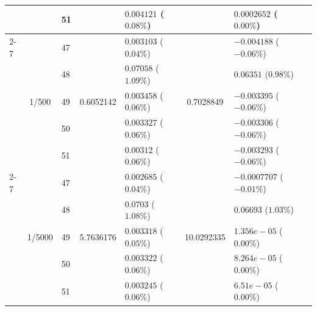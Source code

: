 \begin{table}[htbp]
{\begin{tabular}{lclclclc}
    &                        & 51 &                          & $0.004121$ ($0.08\%$)    &                          & $0.0002652$ ($0.00\%$)     \\
    \cmidrule(lr){2-7}
    & \multirow{5}{*}{1/500} & 47 & \multirow{5}{*}{0.6052142}  & $0.003103$ ($0.04\%$)    & \multirow{5}{*}{0.7028849} & $-0.004188$ ($-0.06\%$)      \\
    &                        & 48 &                          & $0.07058$ ($1.09\%$)  &                          & $0.06351$ ($0.98\%$)     \\
    &                        & 49 &                          & $0.003458$ ($0.06\%$)  &                          & $-0.003395$ ($-0.06\%$)     \\
    &                        & 50 &                          & $0.003327$ ($0.06\%$)  &                          & $-0.003306$ ($-0.06\%$)     \\
    &                        & 51 &                          & $0.00312$ ($0.06\%$)  &                          & $-0.003293$ ($-0.06\%$)     \\
    \cmidrule(lr){2-7}
    & \multirow{5}{*}{1/5000}& 47 & \multirow{5}{*}{5.7636176} & $0.002685$ ($0.04\%$)     & \multirow{5}{*}{10.0292335} & $-0.0007707$ ($-0.01\%$)   \\
    &                         & 48 &                          & $0.0703$ ($1.08\%$)     &                          & $0.06693$ ($1.03\%$)    \\
    &                         & 49 &                          & $0.003318$ ($0.05\%$)   &                          & $1.356e-05$ ($0.00\%$)   \\
    &                         & 50 &                          & $0.003322$ ($0.06\%$)   &                          & $8.264e-05$ ($0.00\%$)    \\
    &                         & 51 &                          & $0.003245$ ($0.06\%$)    &                          & $6.51e-05$ ($0.00\%$)    \\
    \bottomrule
  \end{tabular}%
  }
\end{table}
